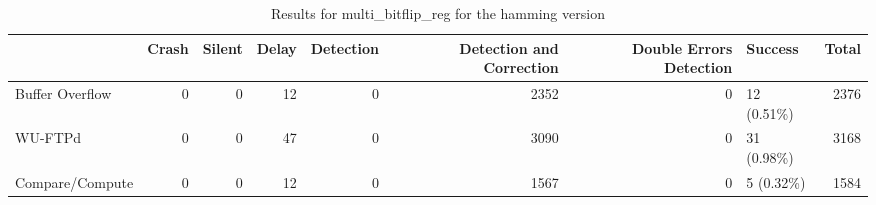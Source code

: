 \begin{table}[t]
	\centering
	\caption{Results for multi_bitflip_reg for the hamming version}
	\label{table:end_sim_by_status_hamming_3_multi_bitflip_reg}
	\begin{tabular}{lrrrrrrlr}
		\toprule
		                & Crash & Silent & Delay & Detection & Detection and Correction & Double Errors Detection & Success     & Total \\
		\midrule
		Buffer Overflow & 0     & 0      & 12    & 0         & 2352                     & 0                       & 12 (0.51\%) & 2376  \\
		WU-FTPd         & 0     & 0      & 47    & 0         & 3090                     & 0                       & 31 (0.98\%) & 3168  \\
		Compare/Compute & 0     & 0      & 12    & 0         & 1567                     & 0                       & 5 (0.32\%)  & 1584  \\
		\bottomrule
	\end{tabular}
\end{table}
